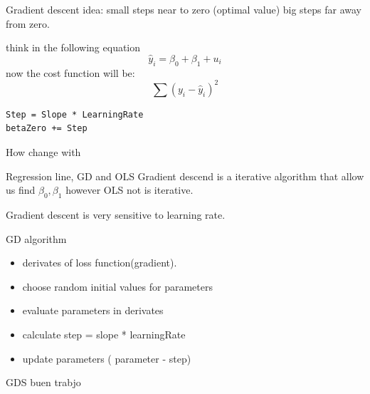 \documentclass{beamer}
\begin{document}
\begin{frame}[fragile]{Gradient descent}
idea: small steps near to zero (optimal value) big steps far away from zero.


think in the following equation 
\begin{equation}
\hat{y}_{i} = \beta_{0} + \beta_{1} + u_{i}
\end{equation}
now the cost function will be:
\begin{equation}
\sum ( y_{i} - \hat{y}_{i})^{2}
\end{equation}

\begin{lstlisting}
Step = Slope * LearningRate
betaZero += Step 

\end{lstlisting}

How change with 

\end{frame}

\begin{frame}{Regression line, GD and OLS}
Gradient descend is a iterative algorithm that allow us find $\beta_{0}, \beta_{1}$ however OLS not is iterative. 

\end{frame}

\begin{frame}
Gradient descent is very sensitive to learning rate.

\end{frame}

\begin{frame}[fragile]{GD algorithm}
\begin{itemize}
\item derivates of loss function(gradient).
\item choose random initial values for parameters
\item evaluate parameters in derivates
\item calculate step  = slope * learningRate
\item update parameters ( parameter - step)
\end{itemize}
\end{frame}

\begin{frame}{GDS}
buen trabjo

\end{frame}
\end{document}
